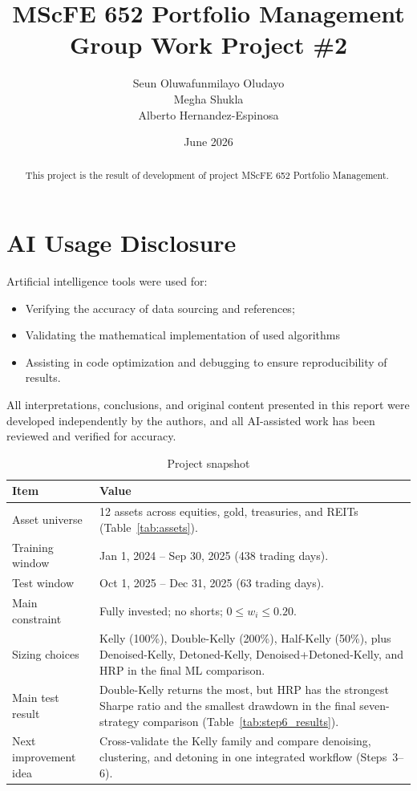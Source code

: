 \documentclass[11pt,a4paper]{article}
\title{MScFE 652 Portfolio Management \\ Group Work Project \#2 }
\author{Seun Oluwafunmilayo Oludayo\\ Megha Shukla\\ Alberto Hernandez-Espinosa}
\date{June 2026}
\begin{document}
\maketitle

\begin{abstract}
This project is the result of development of project MScFE 652 Portfolio Management.
\end{abstract}

\section*{AI Usage Disclosure}
Artificial intelligence tools were used for:
\begin{itemize}
    \item Verifying the accuracy of data sourcing and references;
    \item Validating the mathematical implementation of used algorithms
    \item Assisting in code optimization and debugging to ensure reproducibility of results.
\end{itemize}
All interpretations, conclusions, and original content presented in this report were developed independently by the authors, and all AI-assisted work has been reviewed and verified for accuracy.


\begin{table}[H]
\centering
\caption{Project snapshot}
\label{tab:project_snapshot}
{\small\setlength{\tabcolsep}{4pt}\renewcommand{\arraystretch}{1.15}\begin{tabularx}{\textwidth}{>{\raggedright\arraybackslash}p{4.2cm} X}
\toprule
Item & Value \\
\midrule
Asset universe & 12 assets across equities, gold, treasuries, and REITs (Table~\ref{tab:assets}). \\
Training window & Jan 1, 2024 -- Sep 30, 2025 (438 trading days). \\
Test window & Oct 1, 2025 -- Dec 31, 2025 (63 trading days). \\
Main constraint & Fully invested; no shorts; $0 \le w_i \le 0.20$. \\
Sizing choices & Kelly (100\%), Double-Kelly (200\%), Half-Kelly (50\%), plus Denoised-Kelly, Detoned-Kelly, Denoised+Detoned-Kelly, and HRP in the final ML comparison. \\
Main test result & Double-Kelly returns the most, but HRP has the strongest Sharpe ratio and the smallest drawdown in the final seven-strategy comparison (Table~\ref{tab:step6_results}). \\
Next improvement idea & Cross-validate the Kelly family and compare denoising, clustering, and detoning in one integrated workflow (Steps~3--6). \\
\bottomrule
\end{tabularx}}
\end{table}
\end{document}
